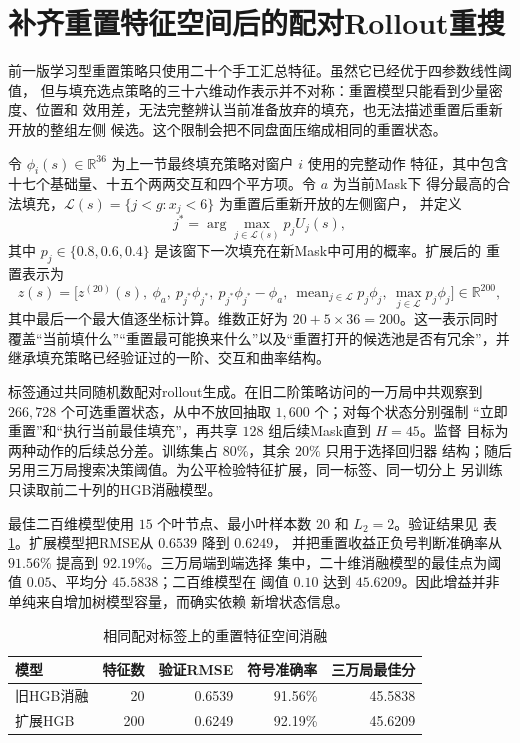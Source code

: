\documentclass[UTF8,11pt,openany]{ctexrep}
\begin{document}
\section{补齐重置特征空间后的配对Rollout重搜}

前一版学习型重置策略只使用二十个手工汇总特征。虽然它已经优于四参数线性阈值，
但与填充选点策略的三十六维动作表示并不对称：重置模型只能看到少量密度、位置和
效用差，无法完整辨认当前准备放弃的填充，也无法描述重置后重新开放的整组左侧
候选。这个限制会把不同盘面压缩成相同的重置状态。

令 $\phi_i(s)\in\mathbb{R}^{36}$ 为上一节最终填充策略对窗户 $i$ 使用的完整动作
特征，其中包含十七个基础量、十五个两两交互和四个平方项。令 $a$ 为当前Mask下
得分最高的合法填充，$\mathcal L(s)=\{j<g:x_j<6\}$ 为重置后重新开放的左侧窗户，
并定义
\[
j^*=\arg\max_{j\in\mathcal L(s)}p_j U_j(s),
\]
其中 $p_j\in\{0.8,0.6,0.4\}$ 是该窗下一次填充在新Mask中可用的概率。扩展后的
重置表示为
\[
z(s)=\Big[z^{(20)}(s),\ \phi_a,\ p_{j^*}\phi_{j^*},\
p_{j^*}\phi_{j^*}-\phi_a,\
\operatorname{mean}_{j\in\mathcal L}p_j\phi_j,\
\operatorname{max}_{j\in\mathcal L}p_j\phi_j\Big]\in\mathbb{R}^{200},
\]
其中最后一个最大值逐坐标计算。维数正好为 $20+5\times36=200$。这一表示同时
覆盖“当前填什么”“重置最可能换来什么”以及“重置打开的候选池是否有冗余”，并
继承填充策略已经验证过的一阶、交互和曲率结构。

标签通过共同随机数配对rollout生成。在旧二阶策略访问的一万局中共观察到
$266{,}728$ 个可选重置状态，从中不放回抽取 $1{,}600$ 个；对每个状态分别强制
“立即重置”和“执行当前最佳填充”，再共享 $128$ 组后续Mask直到 $H=45$。监督
目标为两种动作的后续总分差。训练集占 $80\%$，其余 $20\%$ 只用于选择回归器
结构；随后另用三万局搜索决策阈值。为公平检验特征扩展，同一标签、同一切分上
另训练只读取前二十列的HGB消融模型。

最佳二百维模型使用 $15$ 个叶节点、最小叶样本数 $20$ 和 $L_2=2$。验证结果见
表\ref{tab:reset-feature-ablation}。扩展模型把RMSE从 $0.6539$ 降到 $0.6249$，
并把重置收益正负号判断准确率从 $91.56\%$ 提高到 $92.19\%$。三万局端到端选择
集中，二十维消融模型的最佳点为阈值 $0.05$、平均分 $45.5838$；二百维模型在
阈值 $0.10$ 达到 $45.6209$。因此增益并非单纯来自增加树模型容量，而确实依赖
新增状态信息。

\begin{table}[htbp]
\centering
\caption{相同配对标签上的重置特征空间消融}
\label{tab:reset-feature-ablation}
\begin{tabular}{lrrrr}
\toprule
模型 & 特征数 & 验证RMSE & 符号准确率 & 三万局最佳分 \\
\midrule
旧HGB消融 & 20 & 0.6539 & 91.56\% & 45.5838 \\
扩展HGB & 200 & 0.6249 & 92.19\% & 45.6209 \\
\bottomrule
\end{tabular}
\end{table}
\end{document}
